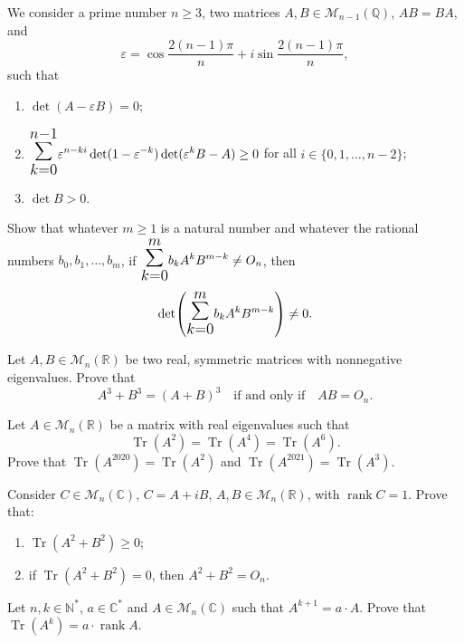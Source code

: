 \documentclass[12pt]{article}
\let\oldsum\sum
\renewcommand{\sum}{\mathlarger{\mathlarger{\oldsum}}}
\begin{document}
\begin{problem}
We consider a prime number $n \ge 3$, two matrices $A, B \in \mathcal{M}_{n-1}(\mathbb{Q})$, $AB = BA$, and
\[
\varepsilon = \cos\frac{2(n-1)\pi}{n} + i\sin\frac{2(n-1)\pi}{n},
\]
such that
\begin{enumerate}[label=\alph*).]
\item $\det(A - \varepsilon B) = 0$;
\item $\displaystyle\sum_{k=0}^{n-1}\varepsilon^{n-ki}\det(1-\varepsilon^{-k})\det(\varepsilon^k B - A) \ge 0$ for all $i \in \{0,1,\dots,n-2\}$;
\item $\det B > 0$.
\end{enumerate}
Show that whatever $m \ge 1$ is a natural number and whatever the rational numbers $b_0, b_1, \dots, b_m$, if $\displaystyle\sum_{k=0}^m b_k A^k B^{m-k} \ne O_n$, then
\[
\det\!\left(\sum_{k=0}^m b_k A^k B^{m-k}\right) \ne 0.
\]
\end{problem}

\begin{problem}
Let $A, B \in \mathcal{M}_n(\mathbb{R})$ be two real, symmetric matrices with nonnegative eigenvalues. Prove that
\[
A^3 + B^3 = (A+B)^3 \quad \text{if and only if} \quad AB = O_n.
\]
\end{problem}

\begin{problem}
Let $A \in \mathcal{M}_n(\mathbb{R})$ be a matrix with real eigenvalues such that
\[
\operatorname{Tr}(A^2) = \operatorname{Tr}(A^4) = \operatorname{Tr}(A^6).
\]
Prove that $\operatorname{Tr}(A^{2020}) = \operatorname{Tr}(A^2)$ and $\operatorname{Tr}(A^{2021}) = \operatorname{Tr}(A^3)$.
\end{problem}

\begin{problem}
Consider $C \in \mathcal{M}_n(\mathbb{C})$, $C = A + iB$, $A, B \in \mathcal{M}_n(\mathbb{R})$, with $\operatorname{rank} C = 1$. Prove that:
\begin{enumerate}[label=\alph*)]
\item $\operatorname{Tr}(A^2+B^2) \ge 0$;
\item if $\operatorname{Tr}(A^2+B^2) = 0$, then $A^2+B^2 = O_n$.
\end{enumerate}
\end{problem}

\begin{problem}
Let $n, k \in \mathbb{N}^*$, $a \in \mathbb{C}^*$ and $A \in \mathcal{M}_n(\mathbb{C})$ such that $A^{k+1} = a \cdot A$. Prove that $\operatorname{Tr}(A^k) = a \cdot \operatorname{rank} A$.
\end{problem}
\end{document}
